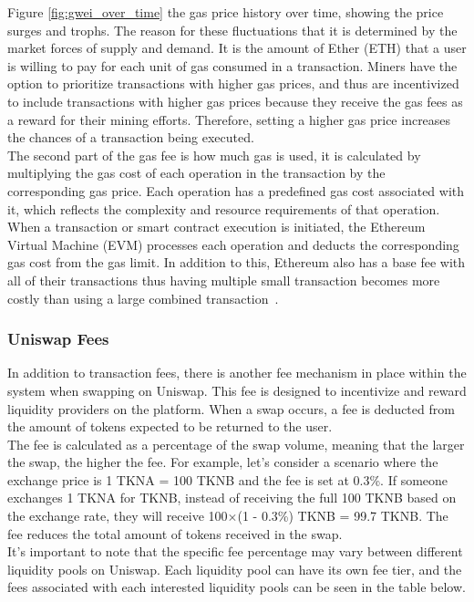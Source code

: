\noindent Figure \ref{fig:gwei_over_time} the gas price history over time, showing the price surges and trophs. The reason for these fluctuations that it is determined by the market forces of supply and demand. It is the amount of Ether (ETH) that a user is willing to pay for each unit of gas consumed in a transaction. Miners have the option to prioritize transactions with higher gas prices, and thus are incentivized to include transactions with higher gas prices because they receive the gas fees as a reward for their mining efforts. Therefore, setting a higher gas price increases the chances of a transaction being executed.
\\[5mm]
The second part of the gas fee is how much gas is used, it is calculated by multiplying the gas cost of each operation in the transaction by the corresponding gas price. Each operation has a predefined gas cost associated with it, which reflects the complexity and resource requirements of that operation. When a transaction or smart contract execution is initiated, the Ethereum Virtual Machine (EVM) processes each operation and deducts the corresponding gas cost from the gas limit. In addition to this, Ethereum also has a base fee with all of their transactions thus having multiple small transaction becomes more costly than using a large combined transaction~\cite{noauthor_gas_nodate}.

\subsubsection{Uniswap Fees}
In addition to transaction fees, there is another fee mechanism in place within the system when swapping on Uniswap. This fee is designed to incentivize and reward liquidity providers on the platform. When a swap occurs, a fee is deducted from the amount of tokens expected to be returned to the user.
\\[5mm]
The fee is calculated as a percentage of the swap volume, meaning that the larger the swap, the higher the fee. For example, let's consider a scenario where the exchange price is 1 TKNA = 100 TKNB and the fee is set at 0.3\%. If someone exchanges 1 TKNA for TKNB, instead of receiving the full 100 TKNB based on the exchange rate, they will receive 100$\times$(1 - 0.3\%) TKNB = 99.7 TKNB. The fee reduces the total amount of tokens received in the swap.
\\[5mm]
It's important to note that the specific fee percentage may vary between different liquidity pools on Uniswap. Each liquidity pool can have its own fee tier, and the fees associated with each interested liquidity pools can be seen in the table below.


